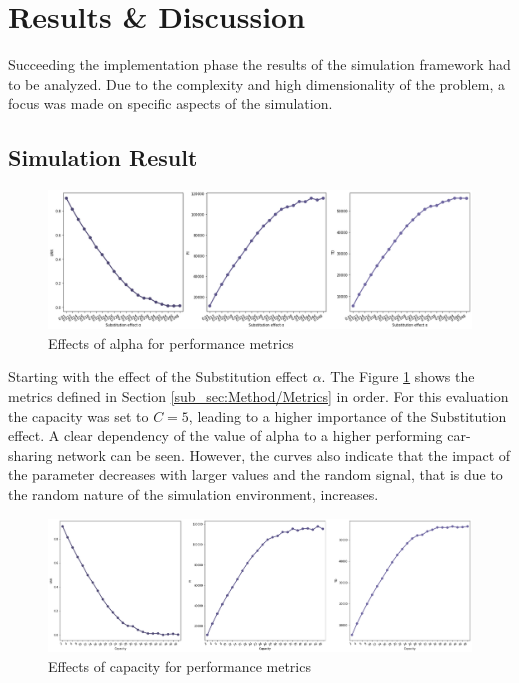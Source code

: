 \clearpage
\section{Results \& Discussion}
\label{sec:Results}


Succeeding the implementation phase the results of the simulation framework had to be analyzed. Due
to the complexity and high dimensionality of the problem, a focus was made on specific aspects of
the simulation.

\subsection{Simulation Result}
\label{sub_sec:Results/Results}

\begin{figure}[htbp]
  \centering
  \includegraphics[width=\linewidth]{./Figures/alpha.png}
  \caption{Effects of alpha for performance metrics}
  \label{fig:Alpha}
\end{figure}

Starting with the effect of the Substitution effect $\alpha$. The Figure \ref{fig:Alpha} shows the
metrics defined in Section \ref{sub_sec:Method/Metrics} in order. For this evaluation the capacity
was set to $C = 5$, leading to a higher importance of the Substitution effect. A clear dependency
of the value of alpha to a higher performing car-sharing network can be seen. However, the curves
also indicate that the impact of the parameter decreases with larger values and the random
signal, that is due to the random nature of the simulation environment, increases.

\begin{figure}[htbp]
  \centering
  \includegraphics[width=\linewidth]{./Figures/capacity.png}
  \caption{Effects of capacity for performance metrics}
  \label{fig:Capacity}
\end{figure}

